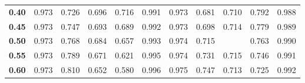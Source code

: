\begin{table}
\begin{small}
\begin{tabular}{l|l|l|l|l|l|l|l|l|l|l}
    \cellcolor[HTML]{EFEFEF}\textbf{0.40}   & \cellcolor[HTML]{FFEEEE}0.973                 & \cellcolor[HTML]{FFEEEE}0.726               & \cellcolor[HTML]{FFEEEE}0.696                     & \cellcolor[HTML]{FFEEEE}0.716                    & \cellcolor[HTML]{FFEEEE}0.991                 & \cellcolor[HTML]{EEFFEE}0.973                 & \cellcolor[HTML]{EEFFEE}0.681               & \cellcolor[HTML]{EEFFEE}0.710                    & \cellcolor[HTML]{EEFFEE}0.792                    & \cellcolor[HTML]{EEFFEE}0.988                       \\ \cline{1-11}
    \cellcolor[HTML]{EFEFEF}\textbf{0.45}   & \cellcolor[HTML]{FFEEEE}0.973                 & \cellcolor[HTML]{FFEEEE}0.747               & \cellcolor[HTML]{FFEEEE}0.693                     & \cellcolor[HTML]{FFEEEE}0.689                    & \cellcolor[HTML]{FFEEEE}0.992                 & \cellcolor[HTML]{EEFFEE}0.973                 & \cellcolor[HTML]{EEFFEE}0.698               & \cellcolor[HTML]{EEFFEE}0.714                    & \cellcolor[HTML]{EEFFEE}0.779                    & \cellcolor[HTML]{EEFFEE}0.989                       \\ \cline{1-11}
    \cellcolor[HTML]{D8D8D8}\textbf{0.50}   & \cellcolor[HTML]{FFEEEE}0.973                 & \cellcolor[HTML]{FFEEEE}0.768               & \cellcolor[HTML]{FFEEEE}0.684                     & \cellcolor[HTML]{FFEEEE}0.657                    & \cellcolor[HTML]{FFEEEE}0.993                 & \cellcolor[HTML]{EEFFEE}0.974                 & \cellcolor[HTML]{EEFFEE}0.715               & \cellcolor[HTML]{DDFFDD}{\textbf{0.716}}         & \cellcolor[HTML]{EEFFEE}0.763                    & \cellcolor[HTML]{EEFFEE}0.990                       \\ \cline{1-11}
    \cellcolor[HTML]{EFEFEF}\textbf{0.55}   & \cellcolor[HTML]{FFEEEE}0.973                 & \cellcolor[HTML]{FFEEEE}0.789               & \cellcolor[HTML]{FFEEEE}0.671                     & \cellcolor[HTML]{FFEEEE}0.621                    & \cellcolor[HTML]{FFEEEE}0.995                 & \cellcolor[HTML]{EEFFEE}0.974                 & \cellcolor[HTML]{EEFFEE}0.731               & \cellcolor[HTML]{EEFFEE}0.715                    & \cellcolor[HTML]{EEFFEE}0.746                    & \cellcolor[HTML]{EEFFEE}0.991                       \\ \cline{1-11} 
    \cellcolor[HTML]{EFEFEF}\textbf{0.60}   & \cellcolor[HTML]{FFEEEE}0.973                 & \cellcolor[HTML]{FFEEEE}0.810               & \cellcolor[HTML]{FFEEEE}0.652                     & \cellcolor[HTML]{FFEEEE}0.580                    & \cellcolor[HTML]{FFEEEE}0.996                 & \cellcolor[HTML]{EEFFEE}0.975                 & \cellcolor[HTML]{EEFFEE}0.747               & \cellcolor[HTML]{EEFFEE}0.713                    & \cellcolor[HTML]{EEFFEE}0.725                    & \cellcolor[HTML]{EEFFEE}0.992                       \\ \cline{1-11}

\end{tabular}
\end{small}
\end{table}
